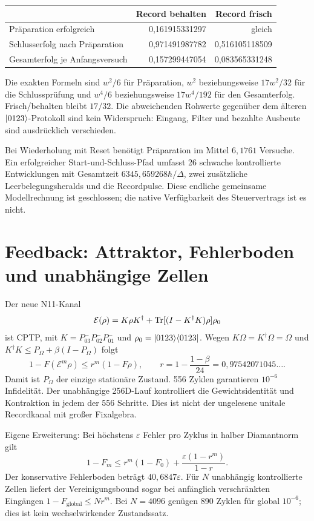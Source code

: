\begin{center}\begin{tabular}{lrr}
\toprule&Record behalten&Record frisch\\\midrule
Präparation erfolgreich&0{,}161915331297&gleich\\
Schlusserfolg nach Präparation&0{,}971491987782&0{,}516105118509\\
Gesamterfolg je Anfangsversuch&0{,}157299447054&0{,}083565331248\\\bottomrule
\end{tabular}\end{center}
Die exakten Formeln sind $w^2/6$ für Präparation, $w^2$ beziehungsweise $17w^2/32$ für die Schlussprüfung und $w^4/6$ beziehungsweise $17w^4/192$ für den Gesamterfolg. Frisch/behalten bleibt $17/32$. Die abweichenden Rohwerte gegenüber dem älteren $\lvert0123\rangle$-Protokoll sind kein Widerspruch: Eingang, Filter und bezahlte Ausbeute sind ausdrücklich verschieden.

Bei Wiederholung mit Reset benötigt Präparation im Mittel $6{,}1761$ Versuche. Ein erfolgreicher Start-und-Schluss-Pfad umfasst 26 schwache kontrollierte Entwicklungen mit Gesamtzeit $6345{,}659268\hbar/\Delta$, zwei zusätzliche Leerbelegungsheralds und die Recordpulse. Diese endliche gemeinsame Modellrechnung ist geschlossen; die native Verfügbarkeit des Steuervertrags ist es nicht.

\section{Feedback: Attraktor, Fehlerboden und unabhängige Zellen}
Der neue N11-Kanal
\begin{equation}
\mathcal E(\rho)=K\rho K^\dagger+
\operatorname{Tr}[(I-K^\dagger K)\rho]\rho_0
\end{equation}
ist CPTP, mit $K=P^-_{03}P^-_{02}P^-_{01}$ und $\rho_0=\lvert0123\rangle\langle0123\rvert$. Wegen $K\Omega=K^\dagger\Omega=\Omega$ und $K^\dagger K\le P_\Omega+\beta(I-P_\Omega)$ folgt
\begin{equation}
1-F(\mathcal E^m\rho)\le r^m(1-F\rho),\qquad
r=1-\frac{1-\beta}{24}=0{,}97542071045\ldots.
\end{equation}
Damit ist $P_\Omega$ der einzige stationäre Zustand. 556 Zyklen garantieren $10^{-6}$ Infidelität. Der unabhängige 256D-Lauf kontrolliert die Gewichtsidentität und Kontraktion in jedem der 556 Schritte. Dies ist nicht der ungelesene unitale Recordkanal mit großer Fixalgebra.

Eigene Erweiterung: Bei höchstens $\varepsilon$ Fehler pro Zyklus in halber Diamantnorm gilt
\begin{equation}
1-F_m\le r^m(1-F_0)+\frac{\varepsilon(1-r^m)}{1-r}.
\end{equation}
Der konservative Fehlerboden beträgt $40{,}6847\varepsilon$. Für $N$ unabhängig kontrollierte Zellen liefert der Vereinigungsbound sogar bei anfänglich verschränkten Eingängen $1-F_{\mathrm{global}}\le Nr^m$. Bei $N=4096$ genügen 890 Zyklen für global $10^{-6}$; dies ist kein wechselwirkender Zustandssatz.

